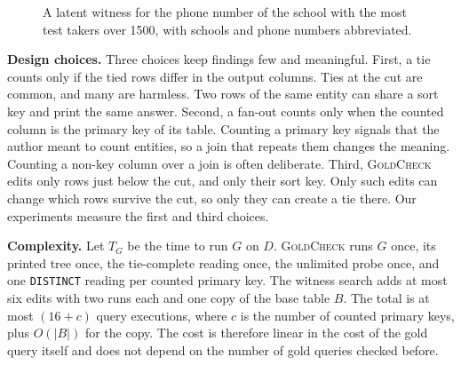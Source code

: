 \documentclass[conference]{IEEEtran}
\newcommand{\sys}{\textsc{GoldCheck}}
\begin{document}
\begin{figure}[t]
\centering
{}
\caption{A latent witness for the phone number of the school with the most test
takers over 1500, with schools and phone numbers abbreviated.}
\label{fig:witness}
\end{figure}

\textbf{Design choices.} Three choices keep findings few and meaningful. First,
a tie counts only if the tied rows differ in the output columns. Ties at the cut
are common, and many are harmless. Two rows of the same entity can share a sort
key and print the same answer. Second, a fan-out counts only
when the counted column is the primary key of its table. Counting a primary key
signals that the author meant to count entities, so a join that repeats them
changes the meaning. Counting a non-key column over a join is often deliberate.
Third, \sys{} edits only rows just below the cut, and only their sort key. Only
such edits can change which rows survive the cut, so only they can create a tie
there. Our experiments measure the first and third choices.

\textbf{Complexity.} Let $T_G$ be the time to run $G$ on $D$. \sys{} runs $G$
once, its printed tree once, the tie-complete reading once, the unlimited probe
once, and one \texttt{DISTINCT} reading per counted primary key. The witness
search adds at most six edits with two runs each and one copy of the base table
$B$. The total is at most $(16 + c)$ query executions, where $c$ is the number
of counted primary keys, plus $O(|B|)$ for the copy. The cost is therefore
linear in the cost of the gold query itself and does not depend on the number of
gold queries checked before.
\end{document}
